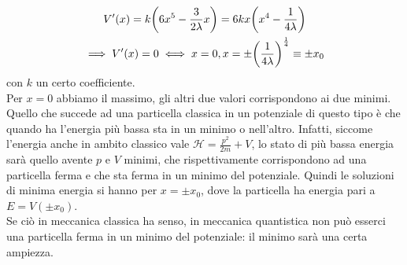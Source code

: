 \begin{soluzione}
\begin{gather*}
      V'(x)
      =k \qty( 6x^5 - \frac{3}{2\lambda}x )
      =6kx \qty( x^4 - \frac{1}{4\lambda} )
      \\
      \implies
      V'(x)=0 \iff x=0, x=\pm \qty( \frac{1}{4\lambda} )^{\frac{1}{4}} \equiv \pm x_0
   \end{gather*}
   con $k$ un certo coefficiente.\\
   Per $x=0$ abbiamo il massimo, gli altri due valori corrispondono ai due minimi.\\
   Quello che succede ad una particella classica in un potenziale di questo tipo è che quando ha l'energia più bassa sta in un minimo o nell'altro. Infatti, siccome l'energia anche in ambito classico vale $\mathcal{H}=\frac{p^2}{2m} + V$, lo stato di più bassa energia sarà quello avente $p$ e $V$ minimi, che rispettivamente corrispondono ad una particella ferma e che sta ferma in un minimo del potenziale. Quindi le soluzioni di minima energia si hanno per $x=\pm x_0$, dove la particella ha energia pari a $E=V(\pm x_0)$.\\
   Se ciò in meccanica classica ha senso, in meccanica quantistica non può esserci una particella ferma in un minimo del potenziale: il minimo sarà una certa ampiezza.
\end{soluzione}

\newpage

